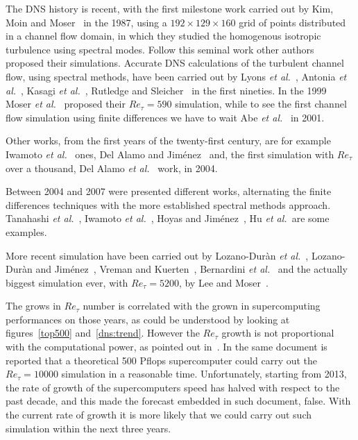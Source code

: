 The DNS history is recent, with the first milestone work carried out by Kim, Moin and Moser~\cite{kim_moin_moser} in the 1987, using a $192\times 129 \times160$ grid of points distributed in a channel flow domain, in which they studied the homogenous isotropic turbulence using spectral modes. Follow this seminal work other authors proposed their simulations.
Accurate DNS calculations of the turbulent channel flow, using spectral methods, have been carried out by Lyons \emph{et al.}~\cite{Lyons}, Antonia \emph{et al.}~\cite{antonia_teitel_kim_browne_1992}, Kasagi \emph{et al.}~\cite{Kasagi}, Rutledge and Sleicher~\cite{Rutledge} in the first nineties. In the 1999 Moser \emph{et al.}~\cite{KMMans} proposed their $Re_{\tau}=590$ simulation, while to see the first channel flow simulation using finite differences we have to wait Abe \emph{et al.}~\cite{Abe} in 2001.\par
Other works, from the first years of the twenty-first century, are for example Iwamoto \emph{et al.}~\cite{Iwamoto} ones, Del Alamo and Jiménez~\cite{delalamo} and, the first simulation with $Re_{\tau}$ over a thousand, Del Alamo \emph{et al.}~\cite{delalamo2} work, in 2004. \par
Between 2004 and 2007 were presented different works, alternating the finite differences techniques with the more established spectral methods approach.
Tanahashi \emph{et al.}~\cite{Tanahashi}, Iwamoto \emph{et al.}~\cite{Iwamoto2}, Hoyas and Jiménez~\cite{Hoyas}, Hu \emph{et al.}~\cite{Hu}are some examples. \par
More recent simulation have been carried out by Lozano-Duràn \emph{et al.}~\cite{Lozano}, Lozano-Duràn and Jiménez~\cite{Lozano2}, Vreman and Kuerten~\cite{Vreman}, Bernardini \emph{et al.}~\cite{Bernardini} and the actually biggest simulation ever, with $Re_{\tau}=5200$, by Lee and Moser~\cite{Lee}. \par



The grows in $Re_{\tau}$ number is correlated with the grown in supercomputing performances on those years, as could be understood by looking at figures~\ref{top500} and~\ref{dns:trend}. However the $Re_{\tau}$ growth is not proportional with the computational power, as pointed out in~\cite{Jimenez2003}. In the same document is reported that a theoretical 500 Pflops supercomputer could carry out the $Re_{\tau}=10000$ simulation in a reasonable time. Unfortunately, starting from 2013, the rate of growth of the supercomputers speed has halved with respect to the past decade, and this made the forecast embedded in such document, false. With the current rate of growth it is more likely that we could carry out such simulation within the next three years. \\~\par



